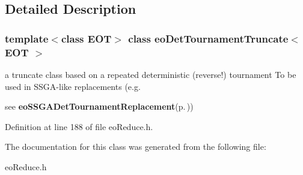 \subsection{Detailed Description}
\subsubsection*{template$<$class EOT$>$ class eo\-Det\-Tournament\-Truncate$<$ EOT $>$}

a truncate class based on a repeated deterministic (reverse!) tournament To be used in SSGA-like replacements (e.g. 

see {\bf eo\-SSGADet\-Tournament\-Replacement}{\rm (p.\,\pageref{classeo_s_s_g_a_det_tournament_replacement})}) 



Definition at line 188 of file eo\-Reduce.h.

The documentation for this class was generated from the following file:\begin{CompactItemize}
\item 
eo\-Reduce.h\end{CompactItemize}
